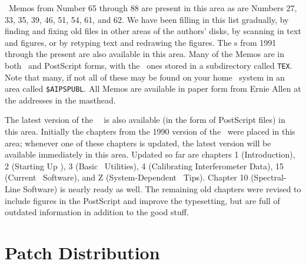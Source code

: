 \AIPS\ Memos from Number 65 through 88 are present in this area as are
Numbers 27, 33, 35, 39, 46, 51, 54, 61, and 62.  We have been filling
in this list gradually, by finding and fixing old files in other areas
of the authors' disks, by scanning in text and figures, or by retyping
text and redrawing the figures.  The \Aipsletter s from 1991 through
the present are also available in this area.  Many of the Memos are in
both \TEX\ and PostScript forms, with the \TEX\ ones stored in a
subdirectory called \hbox{{\tt TEX}}.  Note that many, if not all of
these may be found on your home \AIPS\ system in an area called
\hbox{{\tt \$AIPSPUBL}}.  All Memos are available in paper form from
Ernie Allen at the addresses in the masthead.

The latest version of the \AIPS\ \Cookbook\ is also available (in the
form of PostScript files) in this area.  Initially the chapters from
the 1990 version of the \Cookbook\ were placed in this area;  whenever
one of these chapters is updated, the latest version will be available
immediately in this area.  Updated so far are chapters 1
(Introduction), 2 (Starting Up \AIPS), 3 (Basic \AIPS\ Utilities), 4
(Calibrating Interferometer Data), 15 (Current \AIPS\ Software), and Z
(System-Dependent \AIPS\ Tips).  Chapter 10 (Spectral-Line Software)
is nearly ready as well.  The remaining old chapters were revised to
include figures in the PostScript and improve the typesetting, but are
full of outdated information in addition to the good stuff.

\section{Patch Distribution}

